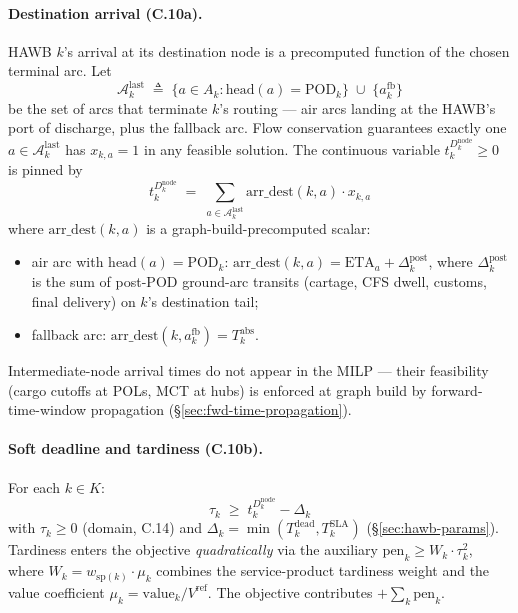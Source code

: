 \documentclass[11pt,a4paper]{article}
\newcommand{\defeq}{\triangleq}
\theoremstyle{definition}
\begin{document}
\paragraph{Destination arrival (C.10a).}
HAWB $k$'s arrival at its destination node is a precomputed function of the
chosen terminal arc. Let
\[
  \mathcal{A}^{\text{last}}_k \;\defeq\; \{a \in A_k : \text{head}(a) =
    \text{POD}_k\} \;\cup\; \{a^{\text{fb}}_k\}
\]
be the set of arcs that terminate $k$'s routing --- air arcs landing at the
HAWB's port of discharge, plus the fallback arc. Flow conservation
guarantees exactly one $a \in \mathcal{A}^{\text{last}}_k$ has $x_{k,a} = 1$
in any feasible solution. The continuous variable $t_k^{D_k^{\text{node}}}
\geq 0$ is pinned by
\begin{equation}
  t_k^{D_k^{\text{node}}} \;=\;
    \sum_{a \in \mathcal{A}^{\text{last}}_k} \text{arr\_dest}(k, a) \cdot x_{k,a}
  \label{eq:C10a}
\end{equation}
where $\text{arr\_dest}(k, a)$ is a graph-build-precomputed scalar:
\begin{itemize}[noitemsep]
  \item air arc with $\text{head}(a) = \text{POD}_k$: $\text{arr\_dest}(k, a)
        = \text{ETA}_a + \Delta^{\text{post}}_k$, where $\Delta^{\text{post}}_k$
        is the sum of post-POD ground-arc transits (cartage, CFS dwell,
        customs, final delivery) on $k$'s destination tail;
  \item fallback arc: $\text{arr\_dest}(k, a^{\text{fb}}_k) = T_k^{\text{abs}}$.
\end{itemize}
Intermediate-node arrival times do not appear in the MILP --- their
feasibility (cargo cutoffs at POLs, MCT at hubs) is enforced at graph build
by forward-time-window propagation (\S\ref{sec:fwd-time-propagation}).

\paragraph{Soft deadline and tardiness (C.10b).}
For each $k \in K$:
\begin{equation}
  \tau_k \;\geq\; t_k^{D_k^{\text{node}}} - \Delta_k
  \label{eq:C10b}
\end{equation}
with $\tau_k \geq 0$ (domain, C.14) and $\Delta_k = \min(T_k^{\text{dead}},
T_k^{\text{SLA}})$ (\S\ref{sec:hawb-params}). Tardiness enters the objective
\emph{quadratically} via the auxiliary $\text{pen}_k \geq W_k \cdot \tau_k^2$,
where $W_k = w_{\text{sp}(k)} \cdot \mu_k$ combines the service-product
tardiness weight and the value coefficient $\mu_k = \text{value}_k /
V^{\text{ref}}$. The objective contributes $+ \sum_k \text{pen}_k$.
\end{document}
